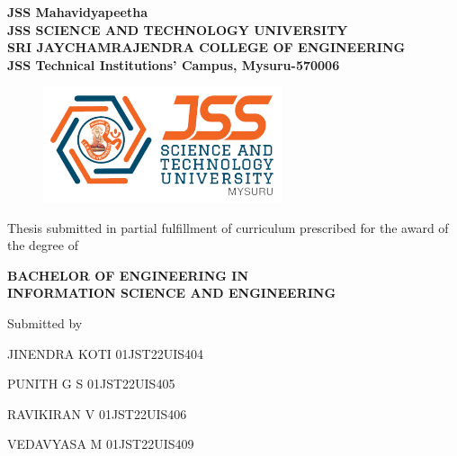 \thispagestyle{empty}


\begin{center}
    { \large {\bfseries{
    JSS Mahavidyapeetha \\
    JSS SCIENCE AND TECHNOLOGY UNIVERSITY \\
    SRI JAYCHAMRAJENDRA COLLEGE OF ENGINEERING\\
    JSS Technical Institutions’ Campus, Mysuru-570006} \par}}
    
    \vspace{1.5\baselineskip}
    {\begin{figure}[!h] 
	\centering
	\includegraphics[width=70mm]{images/JSSSTU.png} 
     \end{figure}
    }

\vspace{1.0\baselineskip}
       {\bf\large \MakeUppercase{\mytitle} \par}

\vspace{1.5\baselineskip}
    {\large{Thesis submitted in partial fulfillment of curriculum prescribed for the award of the degree of} \par}
\vspace{0.5\baselineskip}
    {\large\textbf{BACHELOR OF ENGINEERING IN \\ INFORMATION SCIENCE AND ENGINEERING }\par}

\vspace{1\baselineskip}
    {{Submitted by} \par}

\vspace{\baselineskip}
    {\large {\quad JINENDRA KOTI\hspace{2.1cm} 01JST22UIS404}  \par}
    {\large {\quad PUNITH G S\hspace{3.0cm}     01JST22UIS405}  \par}
    {\large {\quad RAVIKIRAN V\hspace{2.5cm}   01JST22UIS406}  \par}
    {\large {\quad VEDAVYASA M\hspace{2.2cm} 01JST22UIS409}  \par}

\vspace{1 \baselineskip}
    {\bf\MakeUppercase{\mydep} \par}
    {\bf\myyear}
\end{center}

